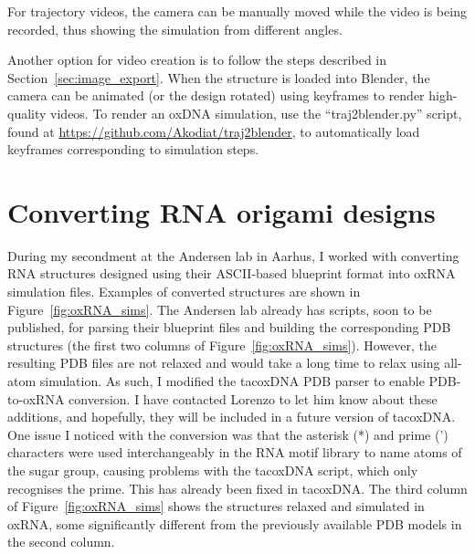 For trajectory videos, the camera can be manually moved while the video is being recorded, thus showing the simulation from different angles.

Another option for video creation is to follow the steps described in Section~\ref{sec:image_export}. When the structure is loaded into Blender, the camera can be animated (or the design rotated) using keyframes to render high-quality videos. To render an oxDNA simulation, use the ``traj2blender.py'' script, found at \url{https://github.com/Akodiat/traj2blender}, to automatically load keyframes corresponding to simulation steps.

\section{Converting RNA origami designs}
\label{sec:converting_rna_origami}
During my secondment at the Andersen lab in Aarhus, I worked with converting RNA structures designed using their ASCII-based blueprint format into oxRNA simulation files. Examples of converted structures are shown in Figure~\ref{fig:oxRNA_sims}. The Andersen lab already has scripts, soon to be published, for parsing their blueprint files and building the corresponding PDB structures (the first two columns of Figure~\ref{fig:oxRNA_sims}). However, the resulting PDB files are not relaxed and would take a long time to relax using all-atom simulation. As such, I modified the tacoxDNA \cite{suma2019tacoxdna} PDB parser to enable PDB-to-oxRNA conversion. I have contacted Lorenzo to let him know about these additions, and hopefully, they will be included in a future version of tacoxDNA. One issue I noticed with the conversion was that the asterisk (*) and prime (') characters were used interchangeably in the RNA motif library to name atoms of the sugar group, causing problems with the tacoxDNA script, which only recognises the prime. This has already been fixed in tacoxDNA. The third column of Figure~\ref{fig:oxRNA_sims} shows the structures relaxed and simulated in oxRNA, some significantly different from the previously available PDB models in the second column.


